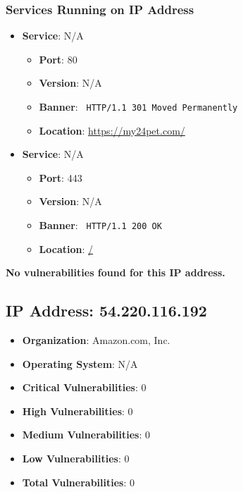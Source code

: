 \documentclass{article}
\begin{document}
\subsubsection*{Services Running on IP Address}

\begin{itemize}
    
        \item \textbf{Service}: N/A
        \begin{itemize}
            \item \textbf{Port}: 80
            \item \textbf{Version}:  N/A 
            \item \textbf{Banner}: \texttt{ HTTP/1.1 301 Moved Permanently
 }
            \item \textbf{Location}: \href{ https://my24pet.com/ }{ https://my24pet.com/ }
        \end{itemize}
    
        \item \textbf{Service}: N/A
        \begin{itemize}
            \item \textbf{Port}: 443
            \item \textbf{Version}:  N/A 
            \item \textbf{Banner}: \texttt{ HTTP/1.1 200 OK
 }
            \item \textbf{Location}: \href{ / }{ / }
        \end{itemize}
    
\end{itemize}


\textbf{No vulnerabilities found for this IP address.}


\clearpage



\subsection*{IP Address: 54.220.116.192}

\begin{itemize}
    \item \textbf{Organization}: Amazon.com, Inc.
    \item \textbf{Operating System}:  N/A 
    \item \textbf{Critical Vulnerabilities}: 0
    \item \textbf{High Vulnerabilities}: 0
    \item \textbf{Medium Vulnerabilities}: 0
    \item \textbf{Low Vulnerabilities}: 0
    \item \textbf{Total Vulnerabilities}: 0
\end{itemize}
\end{document}
